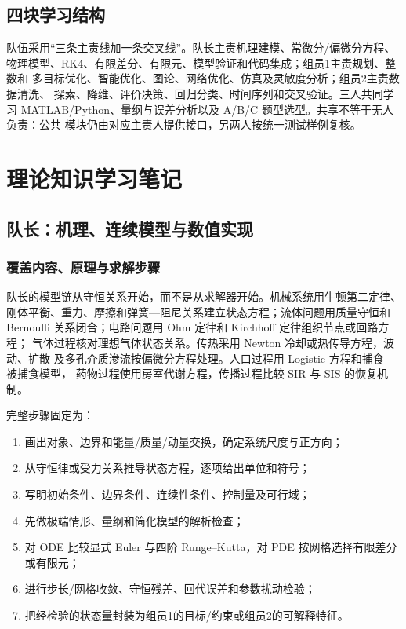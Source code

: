 \documentclass[UTF8,a4paper,12pt]{ctexart}
\begin{document}
\subsection{四块学习结构}

队伍采用“三条主责线加一条交叉线”。队长主责机理建模、常微分/偏微分方程、
物理模型、RK4、有限差分、有限元、模型验证和代码集成；组员1主责规划、整数和
多目标优化、智能优化、图论、网络优化、仿真及灵敏度分析；组员2主责数据清洗、
探索、降维、评价决策、回归分类、时间序列和交叉验证。三人共同学习
MATLAB/Python、量纲与误差分析以及 A/B/C 题型选型。共享不等于无人负责：公共
模块仍由对应主责人提供接口，另两人按统一测试样例复核。

\section{理论知识学习笔记}

\subsection{队长：机理、连续模型与数值实现}

\subsubsection{覆盖内容、原理与求解步骤}

队长的模型链从守恒关系开始，而不是从求解器开始。机械系统用牛顿第二定律、
刚体平衡、重力、摩擦和弹簧—阻尼关系建立状态方程；流体问题用质量守恒和
Bernoulli 关系闭合；电路问题用 Ohm 定律和 Kirchhoff 定律组织节点或回路方程；
气体过程核对理想气体状态关系。传热采用 Newton 冷却或热传导方程，波动、扩散
及多孔介质渗流按偏微分方程处理。人口过程用 Logistic 方程和捕食—被捕食模型，
药物过程使用房室代谢方程，传播过程比较 SIR 与 SIS 的恢复机制。

完整步骤固定为：
\begin{enumerate}
  \item 画出对象、边界和能量/质量/动量交换，确定系统尺度与正方向；
  \item 从守恒律或受力关系推导状态方程，逐项给出单位和符号；
  \item 写明初始条件、边界条件、连续性条件、控制量及可行域；
  \item 先做极端情形、量纲和简化模型的解析检查；
  \item 对 ODE 比较显式 Euler 与四阶 Runge--Kutta，对 PDE 按网格选择有限差分或有限元；
  \item 进行步长/网格收敛、守恒残差、回代误差和参数扰动检验；
  \item 把经检验的状态量封装为组员1的目标/约束或组员2的可解释特征。
\end{enumerate}
\end{document}
